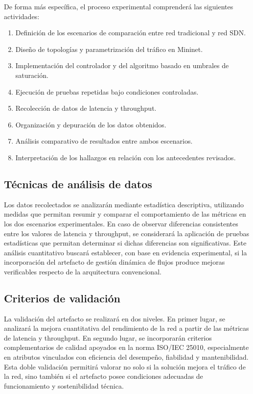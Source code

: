 \documentclass[12pt,a4paper]{article}
\begin{document}
De forma más específica, el proceso experimental comprenderá las siguientes actividades:
\begin{enumerate}
    \item Definición de los escenarios de comparación entre red tradicional y red SDN.
    \item Diseño de topologías y parametrización del tráfico en Mininet.
    \item Implementación del controlador y del algoritmo basado en umbrales de saturación.
    \item Ejecución de pruebas repetidas bajo condiciones controladas.
    \item Recolección de datos de latencia y throughput.
    \item Organización y depuración de los datos obtenidos.
    \item Análisis comparativo de resultados entre ambos escenarios.
    \item Interpretación de los hallazgos en relación con los antecedentes revisados.
\end{enumerate}

\subsection{Técnicas de análisis de datos}

Los datos recolectados se analizarán mediante estadística descriptiva, utilizando medidas que permitan resumir y comparar el comportamiento de las métricas en los dos escenarios experimentales. En caso de observar diferencias consistentes entre los valores de latencia y throughput, se considerará la aplicación de pruebas estadísticas que permitan determinar si dichas diferencias son significativas. Este análisis cuantitativo buscará establecer, con base en evidencia experimental, si la incorporación del artefacto de gestión dinámica de flujos produce mejoras verificables respecto de la arquitectura convencional.

\subsection{Criterios de validación}

La validación del artefacto se realizará en dos niveles. En primer lugar, se analizará la mejora cuantitativa del rendimiento de la red a partir de las métricas de latencia y throughput. En segundo lugar, se incorporarán criterios complementarios de calidad apoyados en la norma ISO/IEC 25010, especialmente en atributos vinculados con eficiencia del desempeño, fiabilidad y mantenibilidad. Esta doble validación permitirá valorar no solo si la solución mejora el tráfico de la red, sino también si el artefacto posee condiciones adecuadas de funcionamiento y sostenibilidad técnica.
\end{document}
